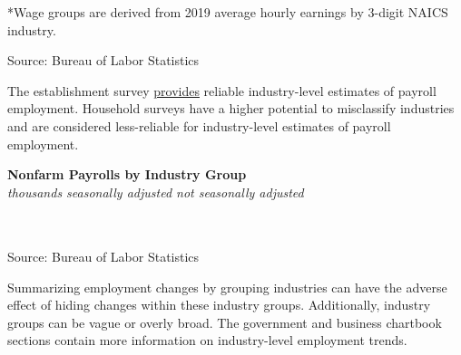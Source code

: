 \documentclass{report}
\newcommand{\tbllink}[1]{\href{https://raw.githubusercontent.com/bdecon/US-chartbook/master/chartbook/data/#1}{\faTable}}
\begin{document}
{\begin{minipage}{0.76\textwidth}
\footnotesize{*Wage groups are derived from 2019 average hourly earnings by 3-digit NAICS industry. }
\vspace*{-1mm}

\footnotesize{Source: Bureau of Labor Statistics} \hfill \tbllink{jobs_tercile.csv}
\end{minipage}
\newpage
\begin{minipage}{0.76\textwidth}
\small The establishment survey \href{https://www.bls.gov/news.release/empsit.t17.htm}{provides} reliable industry-level estimates of payroll employment. Household surveys have a higher potential to misclassify industries and are considered less-reliable for industry-level estimates of payroll employment.


\end{minipage}
\vspace{2mm}

\begin{minipage}{0.86\textwidth}
\normalsize \textbf{Nonfarm Payrolls by Industry Group}\\
\footnotesize{\textit{thousands \hspace{38mm}seasonally adjusted \hspace{30mm} not seasonally adjusted}}\\
\vspace{-5mm}

\hspace*{-3mm} \noindent {} \setlength{\tabcolsep}{4.2pt} \color{black!90}
		{\renewcommand{\arraystretch}{1.55}
		 \begin{tabular}{p{44mm} R{12.8mm} R{11.0mm} R{11.0mm} R{11.0mm} 
		   | R{12.8mm} R{11.0mm}}
			  \hline
		\end{tabular}
		}	\\
		
\vspace{-2mm}
\footnotesize{Source: Bureau of Labor Statistics} \hfill \tbllink{ces_data.csv}
\end{minipage}
\vspace{3mm}

\begin{minipage}{0.76\textwidth}
\small Summarizing employment changes by grouping industries can have the adverse effect of hiding changes within these industry groups. Additionally, industry groups can be vague or overly broad. The government and business chartbook sections contain more information on industry-level employment trends. 
\end{minipage}
\newpage
\begin{minipage}{0.76\textwidth}

\end{minipage}}
\end{document}
